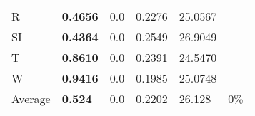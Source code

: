 \documentclass[11pt, a4paper]{article}
\begin{document}
\begin{table}[H]
\begin{tabular}{llllll}
R                                & \textbf{0.4656}                   & 0.0                               & 0.2276                               & 25.0567                                     &                                   \\
SI                        & \textbf{0.4364}                   & 0.0                               & 0.2549                               & 26.9049                                     &                                   \\
T                              & \textbf{0.8610}                   & 0.0                               & 0.2391                               & 24.5470                                     &                                   \\
W                             & \textbf{0.9416}                   & 0.0                               & 0.1985                               & 25.0748                                     &                                   \\ \hline
Average                               & \textbf{0.524}                    & 0.0                               & 0.2202                               & 26.128                                      & 0\%
\end{tabular}
\end{table}
\end{document}
